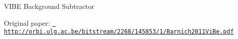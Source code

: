 VIBE Background Subtractor

Original paper\+: \href{http://orbi.ulg.ac.be/bitstream/2268/145853/1/Barnich2011ViBe.pdf}{\texttt{ http\+://orbi.\+ulg.\+ac.\+be/bitstream/2268/145853/1/\+Barnich2011\+Vi\+Be.\+pdf}} 
